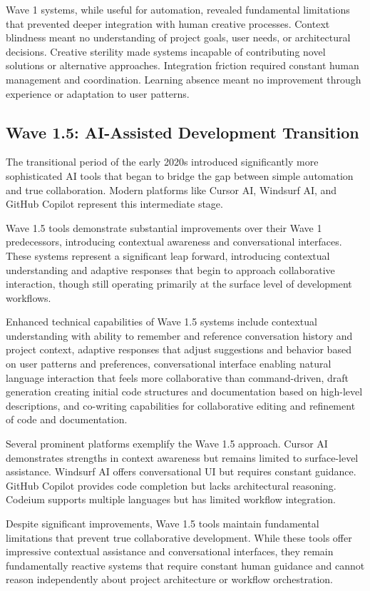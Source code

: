 Wave 1 systems, while useful for automation, revealed fundamental limitations that prevented deeper integration with human creative processes. Context blindness meant no understanding of project goals, user needs, or architectural decisions. Creative sterility made systems incapable of contributing novel solutions or alternative approaches. Integration friction required constant human management and coordination. Learning absence meant no improvement through experience or adaptation to user patterns.

\subsection{Wave 1.5: AI-Assisted Development Transition}

The transitional period of the early 2020s introduced significantly more sophisticated AI tools that began to bridge the gap between simple automation and true collaboration. Modern platforms like Cursor AI, Windsurf AI, and GitHub Copilot represent this intermediate stage.

Wave 1.5 tools demonstrate substantial improvements over their Wave 1 predecessors, introducing contextual awareness and conversational interfaces. These systems represent a significant leap forward, introducing contextual understanding and adaptive responses that begin to approach collaborative interaction, though still operating primarily at the surface level of development workflows.

Enhanced technical capabilities of Wave 1.5 systems include contextual understanding with ability to remember and reference conversation history and project context, adaptive responses that adjust suggestions and behavior based on user patterns and preferences, conversational interface enabling natural language interaction that feels more collaborative than command-driven, draft generation creating initial code structures and documentation based on high-level descriptions, and co-writing capabilities for collaborative editing and refinement of code and documentation.

Several prominent platforms exemplify the Wave 1.5 approach. Cursor AI demonstrates strengths in context awareness but remains limited to surface-level assistance. Windsurf AI offers conversational UI but requires constant guidance. GitHub Copilot provides code completion but lacks architectural reasoning. Codeium supports multiple languages but has limited workflow integration.

Despite significant improvements, Wave 1.5 tools maintain fundamental limitations that prevent true collaborative development. While these tools offer impressive contextual assistance and conversational interfaces, they remain fundamentally reactive systems that require constant human guidance and cannot reason independently about project architecture or workflow orchestration.

